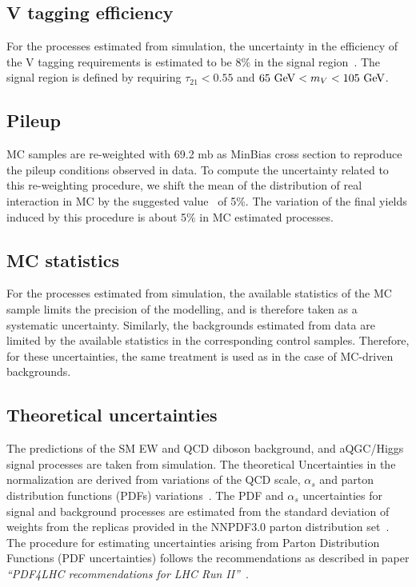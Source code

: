 \subsection{V tagging efficiency}

For the processes estimated from simulation, the uncertainty in the efficiency of the V tagging requirements is estimated to be $8\%$ in the signal region~\cite{jettagging}. The signal region is defined by requiring $\tau_{21}<0.55$ and $ 65 ~\mathrm{GeV} < m_{V} < 105 ~\mathrm{GeV}$. 

\subsection{Pileup}

MC samples are re-weighted with 69.2 mb as MinBias cross section to reproduce the pileup conditions observed in data.
To compute the uncertainty related to this re-weighting procedure, we
shift the mean of the distribution of real interaction in MC by the
suggested value~\cite{twiki:Pileup} of 5\%. 
The variation of the final yields induced by
this procedure is about 5\% in MC estimated processes. 


\subsection{MC statistics}

For the processes estimated from simulation, the
available statistics of the MC sample limits the precision of the
modelling, and is therefore taken as a systematic
uncertainty. Similarly, the backgrounds estimated from data are
limited by the available statistics in the corresponding control
samples. Therefore, for these uncertainties, the same treatment is
used as in the case of MC-driven backgrounds.

\subsection{Theoretical uncertainties}
The predictions of the SM EW and QCD diboson background, and aQGC/Higgs signal processes are taken from simulation. The theoretical Uncertainties in the normalization are derived from variations of the QCD scale, $\alpha_{s}$
and parton distribution functions (PDFs) variations~\cite{Botje:2011sn,Alekhin:2011sk,Lai:2010vv,Martin2009,Ball:2011mu}.
The PDF and $\alpha_s$ uncertainties for signal and background processes are estimated from the standard deviation of weights from the replicas provided in the NNPDF3.0 parton distribution set~\cite{nnpdf}. The procedure for estimating uncertainties arising from Parton Distribution Functions (PDF uncertainties) follows the recommendations as described in paper \textit{``PDF4LHC recommendations for LHC Run II''}~\cite{Butterworth2015}.

